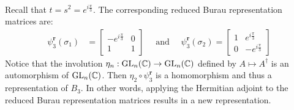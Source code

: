 \begin{example}
\begin{align}
    \end{align}

    Recall that $t=s^2=e^{i\frac{\pi}{3}}$. The corresponding reduced Burau representation matrices are:
    \begin{align}
        \psi_3^\textbf{r}(\sigma_1) &= \begin{bmatrix}
            -e^{i\frac{\pi}{3}} & 0 \\
            1 & 1
        \end{bmatrix} \quad \textrm{ and } \quad
        \psi_3^\textbf{r}(\sigma_2) = \begin{bmatrix}
            1 & e^{i\frac{\pi}{3}} \\
            0 & -e^{i\frac{\pi}{3}}
        \end{bmatrix}
    \end{align}
    Notice that the involution $\eta_n:\textrm{GL}_n(\mathbb{C})\to\textrm{GL}_n(\mathbb{C})$ defined by $A \mapsto A^\dagger$ is an automorphism of $\textrm{GL}_n(\mathbb{C})$. Then $\eta_2\circ\psi_3^\textbf{r}$ is a homomorphism and thus a representation of $B_3$. In other words, applying the Hermitian adjoint to the reduced Burau representation matrices results in a new representation.


\end{example}
